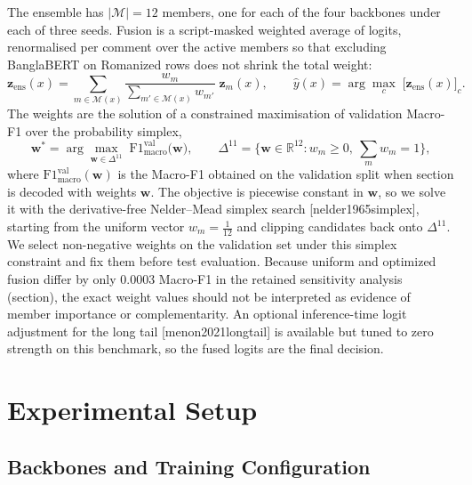 \documentclass[11pt,a4paper]{article}
\def\citep#1{[#1]}%
\def\cref#1{section}%
\begin{document}
The ensemble has $|\mathcal{M}| = 12$ members, one for each of the four backbones under each of three seeds. Fusion is a script-masked weighted average of logits, renormalised per comment over the active members so that excluding BanglaBERT on Romanized rows does not shrink the total weight:
\begin{equation}
\mathbf{z}_{\mathrm{ens}}(x) = \sum_{m \in \mathcal{M}(x)} \frac{w_m}{\sum_{m' \in \mathcal{M}(x)} w_{m'}}\; \mathbf{z}_m(x),
\qquad
\hat{y}(x) = \arg\max_{c}\; \big[\mathbf{z}_{\mathrm{ens}}(x)\big]_c.
\label{eq:fusion}
\end{equation}
The weights are the solution of a constrained maximisation of validation Macro-F1 over the probability simplex,
\begin{equation}
\mathbf{w}^{\ast} = \arg\max_{\mathbf{w} \in \Delta^{11}} \; \mathrm{F1}_{\mathrm{macro}}^{\mathrm{val}}\!\big(\mathbf{w}\big),
\qquad
\Delta^{11} = \Big\{ \mathbf{w} \in \mathbb{R}^{12} : w_m \ge 0,\ \textstyle\sum_{m} w_m = 1 \Big\},
\label{eq:weightopt}
\end{equation}
where $\mathrm{F1}_{\mathrm{macro}}^{\mathrm{val}}(\mathbf{w})$ is the Macro-F1 obtained on the validation split when \cref{eq:fusion} is decoded with weights $\mathbf{w}$. The objective is piecewise constant in $\mathbf{w}$, so we solve it with the derivative-free Nelder--Mead simplex search \citep{nelder1965simplex}, starting from the uniform vector $w_m = \tfrac{1}{12}$ and clipping candidates back onto $\Delta^{11}$. We select non-negative weights on the validation set under this simplex constraint and fix them before test evaluation. Because uniform and optimized fusion differ by only 0.0003 Macro-F1 in the retained sensitivity analysis (\cref{sec:scriptmask-results}), the exact weight values should not be interpreted as evidence of member importance or complementarity. An optional inference-time logit adjustment for the long tail \citep{menon2021longtail} is available but tuned to zero strength on this benchmark, so the fused logits are the final decision.

\section{Experimental Setup}
\label{sec:setup}

\subsection{Backbones and Training Configuration}
\label{sec:config}
\end{document}
